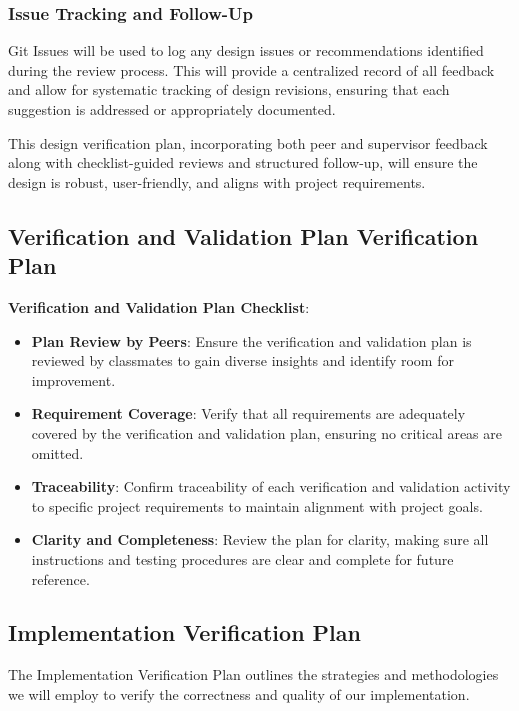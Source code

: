 \documentclass[12pt, titlepage]{article}
\begin{document}
\subsubsection*{Issue Tracking and Follow-Up}
Git Issues will be used to log any design issues or recommendations identified during the review process. This will provide a 
centralized record of all feedback and allow for systematic tracking of design revisions, ensuring that each suggestion is 
addressed or appropriately documented.

\vspace{10pt}
\noindent This design verification plan, incorporating both peer and supervisor feedback along with checklist-guided reviews and 
structured follow-up, will ensure the design is robust, user-friendly, and aligns with project requirements.


\subsection{Verification and Validation Plan Verification Plan}

\textbf{Verification and Validation Plan Checklist}:

\begin{itemize}
    \item \textbf{Plan Review by Peers}: Ensure the verification and validation plan is reviewed by classmates to gain diverse insights 
    and identify room for improvement.
    \item \textbf{Requirement Coverage}: Verify that all requirements are adequately covered by the verification and validation plan, 
    ensuring no critical areas are omitted.
    \item \textbf{Traceability}: Confirm traceability of each verification and validation activity to specific project requirements to 
    maintain alignment with project goals.
    \item \textbf{Clarity and Completeness}: Review the plan for clarity, making sure all instructions and testing procedures are clear 
    and complete for future reference.
\end{itemize}


\subsection{Implementation Verification Plan}

The Implementation Verification Plan outlines the strategies and methodologies we will employ to verify the correctness and quality of 
our implementation.
\end{document}
